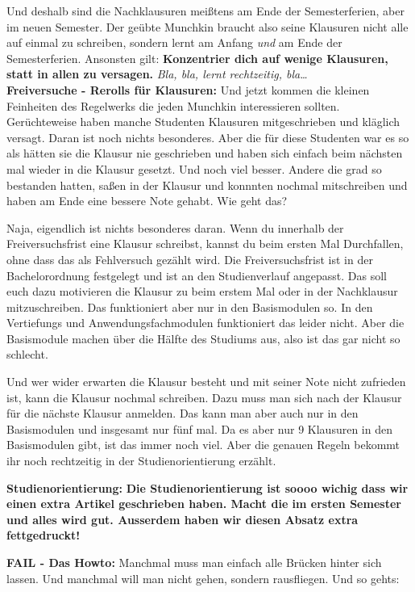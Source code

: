Und deshalb sind die Nachklausuren mei{\ss}tens am Ende der Semesterferien, aber im neuen Semester. Der
ge\"ubte Munchkin braucht also seine Klausuren nicht alle auf einmal zu
schreiben, sondern lernt am Anfang \emph{und} am Ende der Semesterferien.
Ansonsten gilt: \textbf{Konzentrier dich auf wenige Klausuren, statt in allen zu versagen.}
\emph{Bla, bla, lernt rechtzeitig, bla\dots}\\

\textbf{Freiversuche - Rerolls f\"ur Klausuren:}
Und jetzt kommen die kleinen Feinheiten des Regelwerks die jeden Munchkin interessieren sollten.
Ger\"uchteweise haben manche Studenten Klausuren mitgeschrieben und kl\"aglich versagt. Daran ist noch nichts besonderes.
Aber die f\"ur diese Studenten war es so als h\"atten sie die Klausur nie
geschrieben und haben sich einfach beim n\"achsten mal wieder in die Klausur
gesetzt. Und noch viel besser. Andere die grad so bestanden hatten, sa{\ss}en
in der Klausur und konnnten nochmal mitschreiben und haben am Ende eine bessere
Note gehabt. Wie geht das?

Naja, eigendlich ist nichts besonderes daran. Wenn du innerhalb der
Freiversuchsfrist eine Klausur schreibst, kannst du beim ersten Mal
Durchfallen, ohne dass das als Fehlversuch gez\"ahlt wird.
Die Freiversuchsfrist ist in der Bachelorordnung festgelegt und ist an den Studienverlauf angepasst.
Das soll euch dazu motivieren die Klausur zu beim erstem Mal oder in der Nachklausur mitzuschreiben.
Das funktioniert aber nur in den Basismodulen so. In den Vertiefungs und Anwendungsfachmodulen funktioniert das leider nicht.
Aber die Basismodule machen \"uber die H\"alfte des Studiums aus, also ist das gar nicht so schlecht.

Und wer wider erwarten die Klausur besteht und mit seiner Note nicht zufrieden
ist, kann die Klausur nochmal schreiben. Dazu muss man sich nach der Klausur
f\"ur die n\"achste Klausur anmelden. Das kann man aber auch nur in den
Basismodulen und insgesamt nur f\"unf mal. Da es aber nur 9 Klausuren in den Basismodulen gibt,
ist das immer noch viel. Aber die genauen Regeln bekommt ihr noch rechtzeitig in der Studienorientierung erz\"ahlt.

\textbf{Studienorientierung:}
\textbf{
Die Studienorientierung ist soooo wichig dass wir einen extra Artikel geschrieben haben. Macht die im ersten Semester und alles wird gut. Ausserdem haben wir diesen Absatz extra fettgedruckt!}

\textbf{FAIL - Das Howto:}
Manchmal muss man einfach alle Br\"ucken hinter sich lassen. Und manchmal will man nicht gehen, sondern rausfliegen. Und so gehts:

